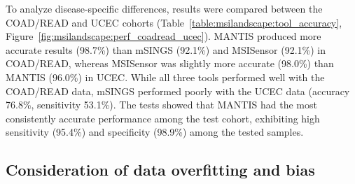 To analyze disease-specific differences, results were compared between the COAD/READ and UCEC cohorts (Table~\ref{table:msilandscape:tool_accuracy}, Figure~\ref{fig:msilandscape:perf_coadread_ucec}). MANTIS produced more accurate results (98.7\%) than mSINGS (92.1\%) and MSISensor (92.1\%) in COAD/READ, whereas MSISensor was slightly more accurate (98.0\%) than MANTIS (96.0\%) in UCEC\@. While all three tools performed well with the COAD/READ data, mSINGS performed poorly with the UCEC data (accuracy 76.8\%, sensitivity 53.1\%). The tests showed that MANTIS had the most consistently accurate performance among the test cohort, exhibiting high sensitivity (95.4\%) and specificity (98.9\%) among the tested samples.

\subsection{Consideration of data overfitting and bias}
